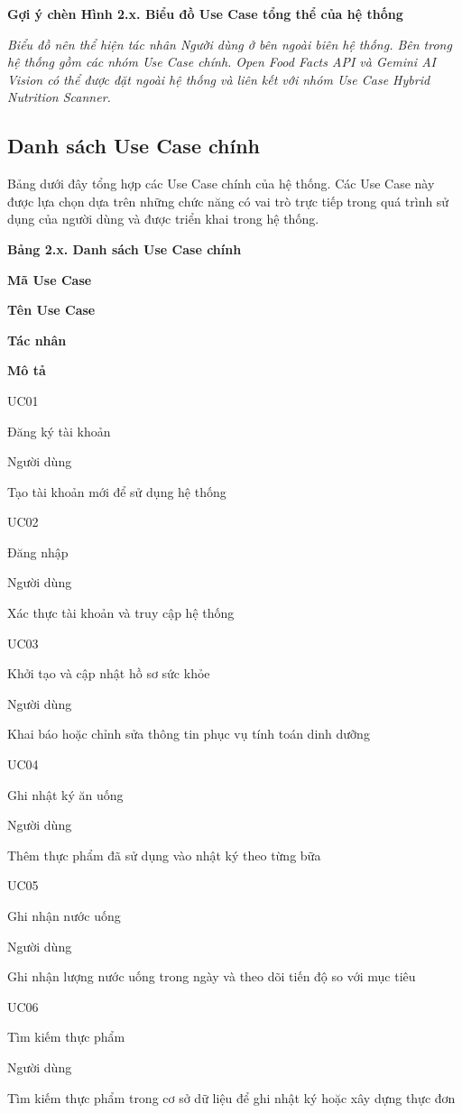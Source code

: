 \documentclass[12pt, a4paper]{report}
\begin{document}
\textbf{Gợi ý chèn Hình 2.x. Biểu đồ Use Case tổng thể của hệ thống}

\textit{Biểu đồ nên thể hiện tác nhân Người dùng ở bên ngoài biên hệ thống. Bên trong hệ thống gồm các nhóm Use Case chính. Open Food Facts API và Gemini AI Vision có thể được đặt ngoài hệ thống và liên kết với nhóm Use Case Hybrid Nutrition Scanner.}

\subsection{Danh sách Use Case chính}Bảng dưới đây tổng hợp các Use Case chính của hệ thống. Các Use Case này được lựa chọn dựa trên những chức năng có vai trò trực tiếp trong quá trình sử dụng của người dùng và được triển khai trong hệ thống.

\textbf{Bảng 2.x. Danh sách Use Case chính}

\textbf{Mã Use Case}

\textbf{Tên Use Case}

\textbf{Tác nhân}

\textbf{Mô tả}

UC01

Đăng ký tài khoản

Người dùng

Tạo tài khoản mới để sử dụng hệ thống

UC02

Đăng nhập

Người dùng

Xác thực tài khoản và truy cập hệ thống

UC03

Khởi tạo và cập nhật hồ sơ sức khỏe

Người dùng

Khai báo hoặc chỉnh sửa thông tin phục vụ tính toán dinh dưỡng

UC04

Ghi nhật ký ăn uống

Người dùng

Thêm thực phẩm đã sử dụng vào nhật ký theo từng bữa

UC05

Ghi nhận nước uống

Người dùng

Ghi nhận lượng nước uống trong ngày và theo dõi tiến độ so với mục tiêu

UC06

Tìm kiếm thực phẩm

Người dùng

Tìm kiếm thực phẩm trong cơ sở dữ liệu để ghi nhật ký hoặc xây dựng thực đơn
\end{document}
